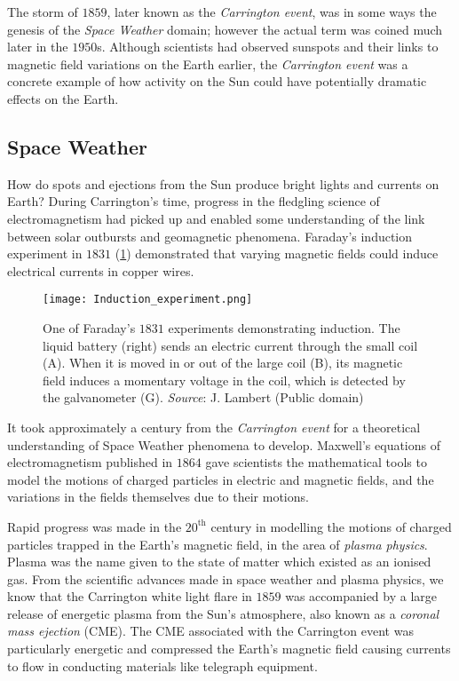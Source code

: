 The storm of $1859$, later known as the \emph{Carrington event}, was in some ways the genesis of 
the \emph{Space Weather} domain; however the actual term was coined much later in the $1950$s. 
Although scientists had observed sunspots and their links to magnetic field variations on the Earth 
earlier, the \emph{Carrington event} was a concrete example of how activity on the Sun could have 
potentially dramatic effects on the Earth.

\subsection*{Space Weather}

How do spots and ejections from the Sun produce bright lights and currents on Earth? During 
Carrington's time, progress in the fledgling science of electromagnetism had picked up and enabled 
some understanding of the link between solar outbursts and geomagnetic phenomena. Faraday's 
induction experiment in $1831$ (\cref{fig:induction}) demonstrated that varying magnetic fields 
could induce electrical currents in copper wires.

\begin{figure}
    \noindent\centering\texttt{[image: Induction\_experiment.png]}
    \caption{
        {\small
            One of Faraday's $1831$ experiments demonstrating induction. 
            The liquid battery (right) sends an electric current through the small coil (A). 
            When it is moved in or out of the large coil (B), its magnetic field induces a 
            momentary voltage in the coil, which is detected by the galvanometer (G). 
            \textit{Source}: J. Lambert (Public domain)
        }
    }
    \label{fig:induction}
\end{figure}

It took approximately a century from the \emph{Carrington event} for a theoretical understanding of 
Space Weather phenomena to develop. Maxwell's equations of electromagnetism \citep{maxwell1865viii} 
published in $1864$ gave scientists the mathematical tools to model the motions of charged 
particles in electric and magnetic fields, and the variations in the fields themselves due to their 
motions.

Rapid progress was made in the $20^{\text{th}}$ century in modelling the motions of charged 
particles trapped in the Earth's magnetic field, in the area of \emph{plasma physics}. 
Plasma was the name given to the state of matter which existed as an ionised gas. From the 
scientific advances made in space weather and plasma physics, we know that the Carrington white 
light flare in $1859$ was accompanied by a large release of energetic plasma from the Sun's 
atmosphere, also known as a \emph{coronal mass ejection} (CME). The CME associated with the 
Carrington event was particularly energetic and compressed the Earth's magnetic field causing 
currents to flow in conducting materials like telegraph equipment. 

